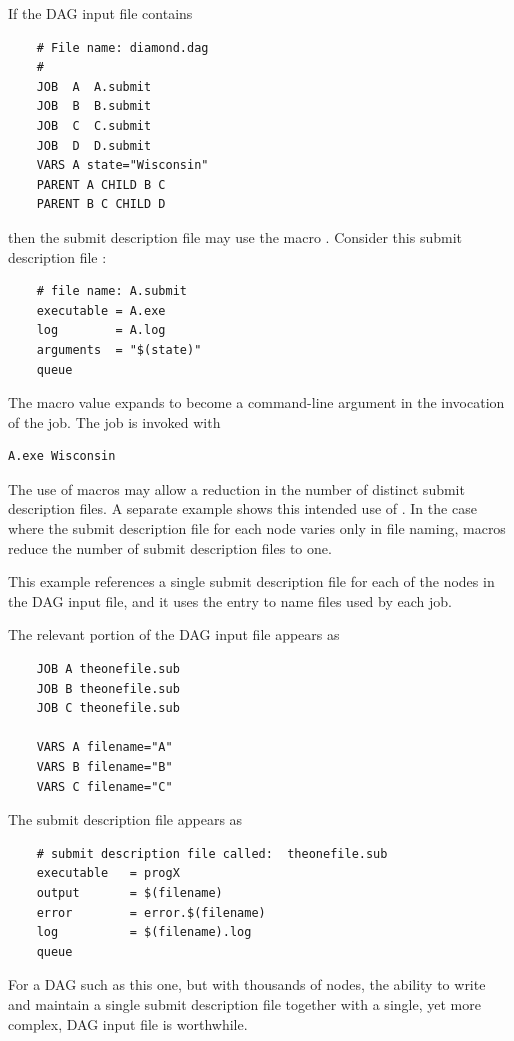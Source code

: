 
If the DAG input file contains
\footnotesize
\begin{verbatim}
    # File name: diamond.dag
    #
    JOB  A  A.submit 
    JOB  B  B.submit 
    JOB  C  C.submit	
    JOB  D  D.submit
    VARS A state="Wisconsin"
    PARENT A CHILD B C
    PARENT B C CHILD D

\end{verbatim}
\normalsize

then the submit description file  may use 
the macro \verb@state@.
Consider this 
submit description file :

\footnotesize
\begin{verbatim}
    # file name: A.submit
    executable = A.exe
    log        = A.log
    arguments  = "$(state)"
    queue
\end{verbatim}
\normalsize
The macro value expands to become a command-line argument in 
the invocation of the job.
The job is invoked with
\footnotesize
\begin{verbatim}
A.exe Wisconsin
\end{verbatim}
\normalsize

The use of macros may allow a reduction in the number 
of distinct submit description files.
A separate example shows this intended use of .
In the case where the submit description file for each node
varies only in file naming, 
macros reduce the number of submit description files to one.

This example references a single submit description file for each of
the nodes in the DAG input file, 
and it uses the  entry to name files used by each job.

The relevant portion of the DAG input file appears as 
\begin{verbatim}
    JOB A theonefile.sub
    JOB B theonefile.sub
    JOB C theonefile.sub

    VARS A filename="A"
    VARS B filename="B"
    VARS C filename="C"
\end{verbatim}

The submit description file appears as 
\footnotesize
\begin{verbatim}
    # submit description file called:  theonefile.sub
    executable   = progX
    output       = $(filename)
    error        = error.$(filename)
    log          = $(filename).log
    queue
\end{verbatim}
\normalsize

For a DAG such as this one, but with thousands of nodes,
the ability to write and maintain a single submit description file 
together with a single, yet more complex, DAG input file is worthwhile.

